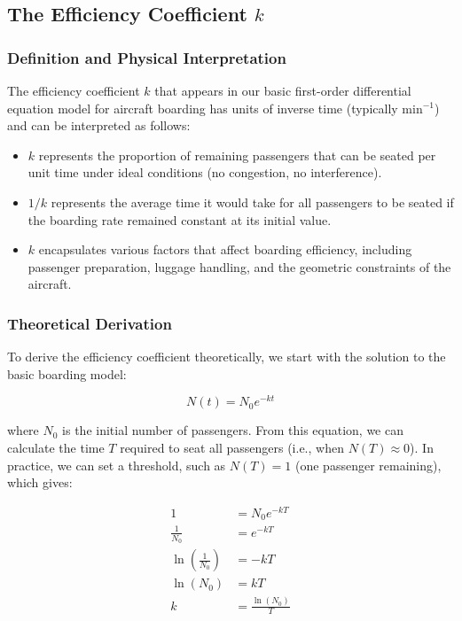 \documentclass[12pt,a4paper]{article}
\begin{document}
\subsection{The Efficiency Coefficient $k$}

\subsubsection{Definition and Physical Interpretation}

The efficiency coefficient $k$ that appears in our basic first-order differential equation model for aircraft boarding has units of inverse time (typically $\text{min}^{-1}$) and can be interpreted as follows:

\begin{itemize}
    \item $k$ represents the proportion of remaining passengers that can be seated per unit time under ideal conditions (no congestion, no interference).
    \item $1/k$ represents the average time it would take for all passengers to be seated if the boarding rate remained constant at its initial value.
    \item $k$ encapsulates various factors that affect boarding efficiency, including passenger preparation, luggage handling, and the geometric constraints of the aircraft.
\end{itemize}

\subsubsection{Theoretical Derivation}

To derive the efficiency coefficient theoretically, we start with the solution to the basic boarding model:

\begin{equation}
N(t) = N_0 e^{-kt}
\end{equation}

where $N_0$ is the initial number of passengers. From this equation, we can calculate the time $T$ required to seat all passengers (i.e., when $N(T) \approx 0$). In practice, we can set a threshold, such as $N(T) = 1$ (one passenger remaining), which gives:

\begin{align}
1 &= N_0 e^{-kT} \\
\frac{1}{N_0} &= e^{-kT} \\
\ln\left(\frac{1}{N_0}\right) &= -kT \\
\ln(N_0) &= kT \\
k &= \frac{\ln(N_0)}{T}
\end{align}
\end{document}
